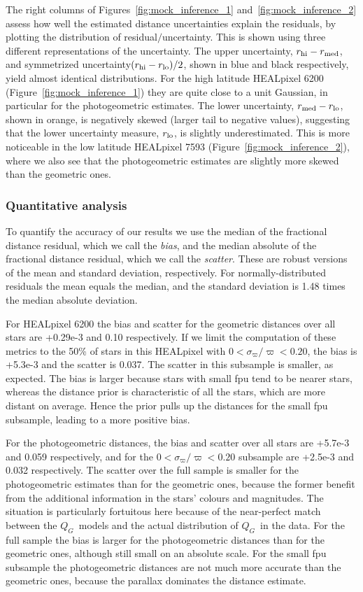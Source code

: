 \documentclass[twocolumn]{aastex62}
\providecommand{\QG}{\ensuremath{Q_G}}
\providecommand{\parallax}{\ensuremath{\varpi}}
\providecommand{\sigparallax}{\ensuremath{\sigma_{\varpi}}}
\providecommand{\fpu}{\ensuremath{\sigparallax/\parallax}}
\providecommand{\dist}{\ensuremath{r}}
\providecommand{\rlo}{\ensuremath{\dist_{\rm lo}}}
\providecommand{\rhi}{\ensuremath{\dist_{\rm hi}}}
\providecommand{\rmed}{\ensuremath{\dist_{\rm med}}}
\begin{document}
The right columns of Figures~\ref{fig:mock_inference_1} and~\ref{fig:mock_inference_2} assess how well the estimated distance uncertainties explain the residuals, by plotting the distribution of residual$/$uncertainty. This is shown using three different representations of the uncertainty. 
The upper uncertainty, $\rhi-\rmed$, and symmetrized uncertainty$(\rhi-\rlo)/2$, shown in blue and black respectively, yield almost identical distributions.
For the high latitude HEALpixel 6200 (Figure~\ref{fig:mock_inference_1}) they are quite close to a unit Gaussian, in particular for the photogeometric estimates. The lower uncertainty,  $\rmed-\rlo$, shown in orange, is negatively skewed (larger tail to negative values),  suggesting that the lower uncertainty measure, \rlo, is slightly underestimated. 
This is more noticeable in the low latitude HEALpixel 7593 (Figure~\ref{fig:mock_inference_2}), where we also see that the photogeometric estimates are slightly more skewed than the geometric ones.


\subsubsection{Quantitative analysis}\label{sec:mock_quantitative_analysis}

To quantify the accuracy of our results we use the median of the fractional distance residual, which we call the {\em bias}, and the median absolute of the fractional distance residual, which we call the {\em scatter}. 
These are robust versions of the mean and standard deviation, respectively. For normally-distributed residuals the mean equals the median, and the standard deviation is 1.48 times the median absolute deviation.

For HEALpixel 6200 the bias and scatter for the geometric distances over all stars are +0.29e-3 and 0.10 respectively. If we limit the computation of these metrics to the 50\% of stars in this HEALpixel with $0 < \fpu < 0.20$, the bias is +5.3e-3 and the scatter is 0.037. The scatter in this subsample is smaller, as expected. The bias is larger because stars with small fpu tend to be nearer stars, whereas the distance prior is characteristic of all the stars, which are more distant on average. Hence the prior pulls up the distances for the small fpu subsample, leading to a more positive bias.

For the photogeometric distances, the bias and scatter over all stars are +5.7e-3 and 0.059 respectively, and for the $0 < \fpu < 0.20$ subsample are +2.5e-3 and 0.032 respectively. 
The scatter over the full sample is smaller for the photogeometric estimates than for the geometric ones, because the former benefit from the additional information in the stars' colours and magnitudes. The situation is particularly fortuitous here because of the near-perfect match between the \QG\ models and the actual distribution of \QG\ in the data. 
For the full sample the bias is larger for the photogeometric distances than for the geometric ones, although still small on an absolute scale.
For the small fpu subsample the photogeometric distances are not much more accurate than the geometric ones, because the parallax dominates the distance estimate.
 
\end{document}
